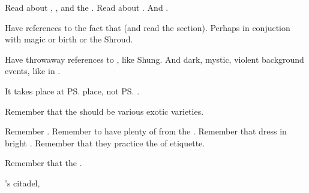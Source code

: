 \begin{comment}
  \section{Wanderer in Darkness}
\end{comment}

\begin{comment}
  \subsection{Things to remember}
\end{comment}
\begin{garbage}
Read about , ,  and the .
Read about . 
And . 

Have references to the fact that  (and read the section). 
Perhaps in conjuction with magic or birth or the Shroud. 

Have throwaway references to , like Shung. 
And dark, mystic, violent background events, like in .

It takes place at \ps{\Teshrial} place, not \ps{\Ganethed}. 

Remember that the \humans should be various exotic \demihuman varieties.

Remember . 
Remember to have plenty of  from the \resphain. 
Remember that \CiriathSepher dress in bright \colours. 
Remember that they practice the  of etiquette.

Remember that the .
 
\end{garbage}

\begin{comment}
  \subsection{Teshrial at the window}
\end{comment}
\stamp
  {\dateIshnaruchaefirIntroduced}
  {\Teshrial's citadel, }
\index{\CiriathSepher}
\index{\Nyx}

